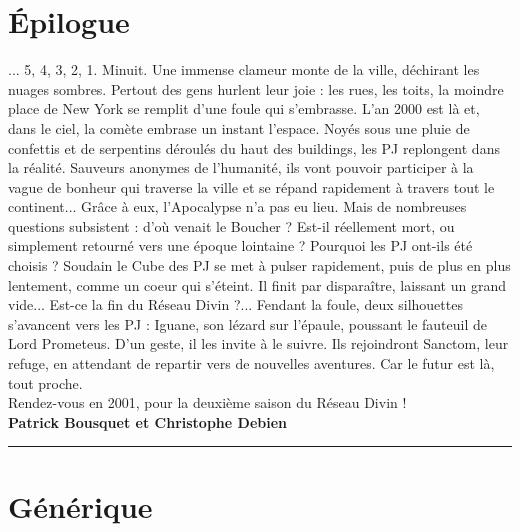 \documentclass[11pt,twoside,a4paper]{book}
\begin{document}
\setlength\parindent{0pt}

\section*{{\'E}pilogue}

... 5, 4, 3, 2, 1. Minuit. Une immense clameur monte de la ville, d{\'e}chirant les nuages sombres. Pertout des gens hurlent leur joie : les rues, les toits, la moindre place de New York se remplit d'une foule qui s'embrasse. L'an 2000 est l{\`a} et, dans le ciel, la com{\`e}te embrase un instant l'espace. Noy{\'e}s sous une pluie de confettis et de serpentins d{\'e}roul{\'e}s du haut des buildings, les PJ replongent dans la r{\'e}alit{\'e}. Sauveurs anonymes de l'humanit{\'e}, ils vont pouvoir participer {\`a} la vague de bonheur qui traverse la ville et se r{\'e}pand rapidement {\`a} travers tout le continent... Gr{\^a}ce {\`a} eux, l'Apocalypse n'a pas eu lieu. Mais de nombreuses questions subsistent : d'o{\`u} venait le Boucher ? Est-il r{\'e}ellement mort, ou simplement retourn{\'e} vers une {\'e}poque lointaine ? Pourquoi les PJ ont-ils {\'e}t{\'e} choisis ? Soudain le Cube des PJ se met {\`a} pulser rapidement, puis de plus en plus lentement, comme un coeur qui s'{\'e}teint. Il finit par dispara{\^i}tre, laissant un grand vide... Est-ce la fin du R{\'e}seau Divin ?... Fendant la foule, deux silhouettes s'avancent vers les PJ : Iguane, son l{\'e}zard sur l'{\'e}paule, poussant le fauteuil de Lord Prometeus. D'un geste, il les invite {\`a} le suivre. Ils rejoindront Sanctom, leur refuge, en attendant de repartir vers de nouvelles aventures. Car le futur est l{\`a}, tout proche.~\\

Rendez-vous en 2001, pour la deuxi{\`e}me saison du R{\'e}seau Divin !~\\

\textbf{Patrick Bousquet et Christophe Debien}~\\

\begin{center} \rule{10cm}{0.1cm} \end{center}

\clearpage

\section*{G{\'e}n{\'e}rique}
\end{document}
